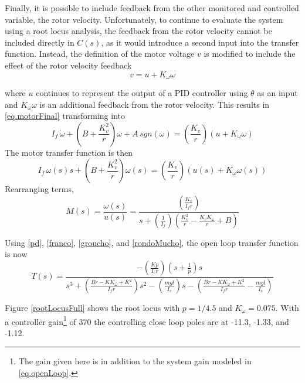 \documentclass[12pt,letterpaper]{article}
\begin{document}
Finally, it is possible to include feedback from the other monitored and controlled variable, the rotor velocity.
Unfortunately, to continue to evaluate the system using a root locus analysis, the feedback from
the rotor velocity cannot be included directly in $C(s)$, as it would introduce a second input into the transfer function.  
Instead, the definition of the motor voltage $v$ is modified to include the effect of the rotor velocity feedback
\begin{equation}
    v = u + K_{\omega}\omega
\end{equation}

where $u$ continues to represent the output of a PID controller using $\theta$ as an input and $K_{\omega}\omega$ is an additional feedback
from the rotor velocity.
%
This results in \eqref{eq.motorFinal} transforming into
\begin{equation}
    I_{f} \, \dot{\omega} + \left( B+\frac{K_{v}^2}{r} \right) \omega +A \, sgn(\omega)= \left(\frac{K_{v}} {r}\right)(u + K_{\omega}\omega)
\end{equation}
The motor transfer function is then
\begin{equation}
    I_{f} \, \omega(s) s + \left( B+\frac{K_{v}^2}{r} \right) \omega(s) = \left(\frac{K_{v}} {r}\right)(u(s)+K_{\omega} \omega(s))
\end{equation}
Rearranging terms,
\begin{equation}
    M(s) = \frac{\omega(s)}{u(s)} =  \frac{\left(\frac{K_{v}} {I_{f}r}\right)}{s + (\frac{1}{I_{f}})(\frac{K_{v}^2}{r}-\frac{K_{v} K_{\omega}}{r}+B)}
    \label{rondoMucho}
\end{equation} 

Using \eqref{pd}, \eqref{franco}, \eqref{groucho}, and \eqref{rondoMucho}, the open loop transfer function is now
\begin{equation}
	T(s) =\frac{-(\frac{Kp} {I_{c}r})(s+\frac{1}{p})s}
	{s^3 + (\frac{B r-K K_{\omega}+K^2}{I_{f}r})s^2 - (\frac{m g l}{I_{c}})s - (\frac{Br-K K_{\omega}+K^2}{I_{f}r} - \frac{m g l}{I_{c}})}\label{eq.openLoop}
\end{equation}

Figure \ref{rootLocusFull} shows the root locus with $p = 1/4.5$ and $K_{\omega} = 0.075$.  With a controller gain\footnote{The gain given here is in addition to the system gain modeled in \eqref{eq.openLoop}. } of 370 the controlling close loop poles are at -11.3, -1.33, and -1.12.\\
\end{document}
